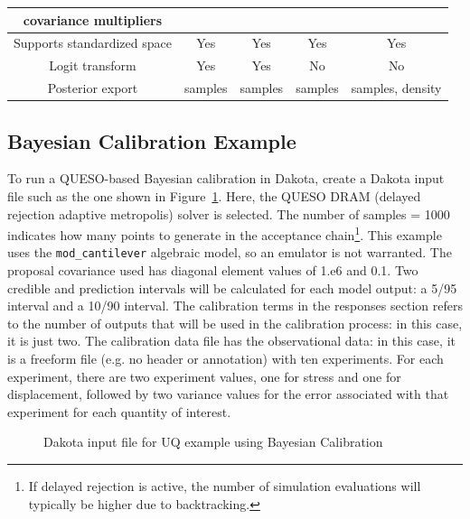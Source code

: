 \begin{table}
\begin{tabular}{|c|c|c|c|c|}
covariance multipliers         &                 &                 &                        &              \\
\hline
Supports standardized space    &  Yes            & Yes             & Yes                    & Yes           \\             
\hline
Logit transform                &  Yes            & Yes             &  No                    & No            \\             
\hline
Posterior export               &  samples        & samples         &  samples               & samples, density \\             
\hline
\end{tabular}
\end{table}


\subsection{Bayesian Calibration Example}\label{uq:bayesian:ex}

To run a QUESO-based Bayesian calibration in Dakota, create a Dakota
input file such as the one shown in Figure~\ref{uq:figure18}.  Here,
the QUESO DRAM (delayed rejection adaptive metropolis) solver is
selected. The number of samples = 1000 indicates how many points to
generate in the acceptance chain\footnote{If delayed rejection is
  active, the number of simulation evaluations will typically be
  higher due to backtracking.}.  This example uses the
\texttt{mod\_cantilever} algebraic model, so an emulator is not
warranted.  The proposal covariance used has diagonal element values
of 1.e6 and 0.1. Two credible and prediction intervals will be
calculated for each model output: a 5/95 interval and a 10/90
interval. The calibration terms in the responses section refers to the
number of outputs that will be used in the calibration process: in
this case, it is just two. The calibration data file has the
observational data: in this case, it is a freeform file (e.g. no
header or annotation) with ten experiments. For each experiment, there
are two experiment values, one for stress and one for displacement,
followed by two variance values for the error associated with that
experiment for each quantity of interest.

\begin{figure}[htbp!]
  \centering
  \begin{bigbox}
    \begin{small}
    \end{small}
  \end{bigbox}
  \caption{Dakota input file for UQ example using Bayesian Calibration}
\label{uq:figure18}
\end{figure}

